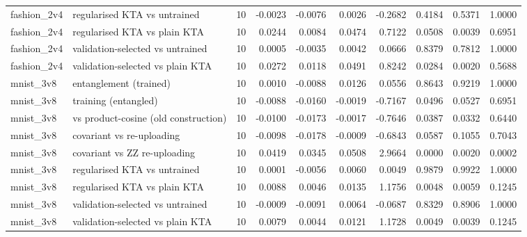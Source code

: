 \begin{table}
\begin{tabular}{llrrrrrrrr}
fashion\_2v4 & regularised KTA vs untrained & 10 & -0.0023 & -0.0076 & 0.0026 & -0.2682 & 0.4184 & 0.5371 & 1.0000 \\
fashion\_2v4 & regularised KTA vs plain KTA & 10 & 0.0244 & 0.0084 & 0.0474 & 0.7122 & 0.0508 & 0.0039 & 0.6951 \\
fashion\_2v4 & validation-selected vs untrained & 10 & 0.0005 & -0.0035 & 0.0042 & 0.0666 & 0.8379 & 0.7812 & 1.0000 \\
fashion\_2v4 & validation-selected vs plain KTA & 10 & 0.0272 & 0.0118 & 0.0491 & 0.8242 & 0.0284 & 0.0020 & 0.5688 \\
mnist\_3v8 & entanglement (trained) & 10 & 0.0010 & -0.0088 & 0.0126 & 0.0556 & 0.8643 & 0.9219 & 1.0000 \\
mnist\_3v8 & training (entangled) & 10 & -0.0088 & -0.0160 & -0.0019 & -0.7167 & 0.0496 & 0.0527 & 0.6951 \\
mnist\_3v8 & vs product-cosine (old construction) & 10 & -0.0100 & -0.0173 & -0.0017 & -0.7646 & 0.0387 & 0.0332 & 0.6440 \\
mnist\_3v8 & covariant vs re-uploading & 10 & -0.0098 & -0.0178 & -0.0009 & -0.6843 & 0.0587 & 0.1055 & 0.7043 \\
mnist\_3v8 & covariant vs ZZ re-uploading & 10 & 0.0419 & 0.0345 & 0.0508 & 2.9664 & 0.0000 & 0.0020 & 0.0002 \\
mnist\_3v8 & regularised KTA vs untrained & 10 & 0.0001 & -0.0056 & 0.0060 & 0.0049 & 0.9879 & 0.9922 & 1.0000 \\
mnist\_3v8 & regularised KTA vs plain KTA & 10 & 0.0088 & 0.0046 & 0.0135 & 1.1756 & 0.0048 & 0.0059 & 0.1245 \\
mnist\_3v8 & validation-selected vs untrained & 10 & -0.0009 & -0.0091 & 0.0064 & -0.0687 & 0.8329 & 0.8906 & 1.0000 \\
mnist\_3v8 & validation-selected vs plain KTA & 10 & 0.0079 & 0.0044 & 0.0121 & 1.1728 & 0.0049 & 0.0039 & 0.1245 \\
\bottomrule
\end{tabular}
\end{table}
